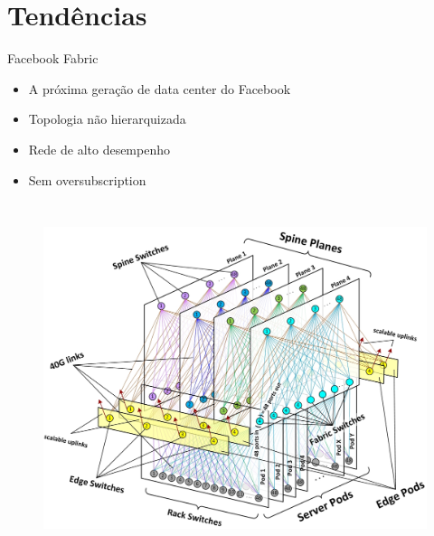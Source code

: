 \documentclass[aspectratio=169]{beamer}
\begin{document}
\section{Tendências}
    \begin{frame} {Facebook Fabric}
	  \begin{itemize}        
		            \item
		                  A próxima geração de data center do Facebook
		             \item
		               Topologia não hierarquizada
		                
		               \item
		                 Rede de alto desempenho
		               \item
		               		Sem oversubscription
		     \end{itemize}
              \begin{columns}    
              \begin{figure}[ht]    
                  \includegraphics[scale=0.3]{scheme_fabric.jpg}
                  \label{fig:problems}
              \end{figure}
                         

\end{columns}
\end{frame}
\end{document}
